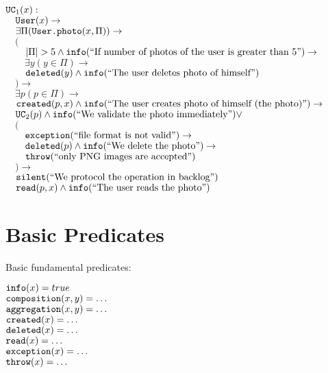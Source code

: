 \documentclass{article}
\begin{document}
    \begin{maths}
    $\mbox{\texttt{UC}}_1(x) : $ \\
    $\quad \mbox{\texttt{User}}(x) \to$ \\
    $\quad \exists \Pi(\mbox{\texttt{User.photo}}(x, \Pi)) \to$ \\
    $\quad ($ \\
    $\quad\quad |\Pi| > 5 \wedge \mbox{\texttt{info}}(\mbox{``If number of photos of the user is greater than 5''})\to$ \\
    $\quad\quad \exists y(y \in \Pi) \to$ \\
    $\quad\quad \mbox{\texttt{deleted}}(y) \wedge \mbox{\texttt{info}}(\mbox{``The user deletes photo of himself''})$ \\
    $\quad ) \to$ \\
    $\quad \exists p(p \in \Pi) \to$ \\
    $\quad \mbox{\texttt{created}}(p, x) \wedge \mbox{\texttt{info}}(\mbox{``The user creates photo of himself (the photo)''})\to$ \\
    $\quad \mbox{\texttt{UC}}_2(p) \wedge \mbox{\texttt{info}}(\mbox{``We validate the photo immediately''}) \vee$ \\
    $\quad ($ \\
    $\quad\quad \mbox{\texttt{exception}}(\mbox{``file format is not valid''}) \to$ \\
    $\quad\quad \mbox{\texttt{deleted}}(p) \wedge \mbox{\texttt{info}}(\mbox{``We delete the photo''})\to$ \\
    $\quad\quad \mbox{\texttt{throw}}(\mbox{``only PNG images are accepted''})$ \\
    $\quad ) \to$ \\
    $\quad \mbox{\texttt{silent}}(\mbox{``We protocol the operation in backlog''})$ \\
    $\quad \mbox{\texttt{read}}(p, x)\wedge \mbox{\texttt{info}}(\mbox{``The user reads the photo''})$ \\
    \end{maths}
    
\newpage
\section{Basic Predicates}

    Basic fundamental predicates:

    \begin{maths}
    $\mbox{\texttt{info}}(x) = true$ \\
    $\mbox{\texttt{composition}}(x, y) = \dots$ \\
    $\mbox{\texttt{aggregation}}(x, y) = \dots$ \\
    $\mbox{\texttt{created}}(x) = \dots$ \\
    $\mbox{\texttt{deleted}}(x) = \dots$ \\
    $\mbox{\texttt{read}}(x) = \dots$ \\
    $\mbox{\texttt{exception}}(x) = \dots$ \\
    $\mbox{\texttt{throw}}(x) = \dots$ \\
    \end{maths}
\end{document}
